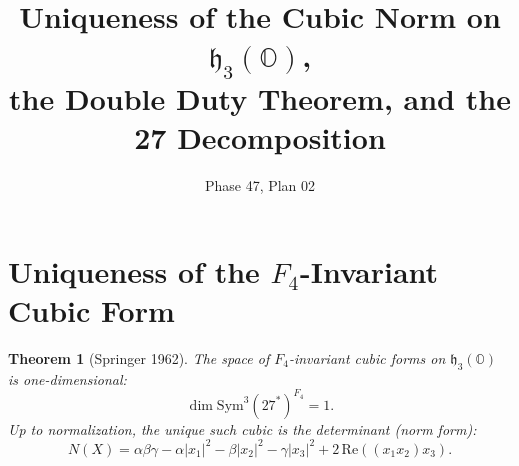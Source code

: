\documentclass[11pt]{article}
\title{Uniqueness of the Cubic Norm on $\mathfrak{h}_3(\mathbb{O})$,\\
the Double Duty Theorem, and the 27 Decomposition}
\date{Phase 47, Plan 02}
\newtheorem{theorem}{Theorem}
\begin{document}
\maketitle

\section{Uniqueness of the $F_4$-Invariant Cubic Form}

\begin{theorem}[Springer 1962]\label{thm:uniqueness}
The space of $F_4$-invariant cubic forms on $\mathfrak{h}_3(\mathbb{O})$ is one-dimensional:
\[
\dim \mathrm{Sym}^3(27^*)^{F_4} = 1.
\]
Up to normalization, the unique such cubic is the determinant (norm form):
\[
N(X) = \alpha\beta\gamma - \alpha|x_1|^2 - \beta|x_2|^2 - \gamma|x_3|^2 + 2\,\mathrm{Re}((x_1 x_2)x_3).
\]
\end{theorem}
\end{document}
